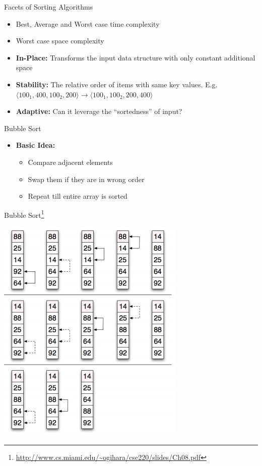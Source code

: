 \documentclass{beamer}
\begin{document}
\begin{frame}{Facets of Sorting Algorithms}
\begin{itemize}
\item Best, Average and Worst case time complexity 
\item Worst case space complexity
\item {\bf In-Place:} Transforms the input data structure with only constant additional space
\item {\bf Stability:} The relative order of items with same key values. 
E.g. $\langle 100_1, 400, 100_2, 200\rangle \rightarrow \langle 100_1, 100_2, 200, 400 \rangle$
\item {\bf Adaptive:} Can it leverage the ``sortedness'' of input?
\end{itemize}
\end{frame}



\begin{frame}{Bubble Sort}
\begin{itemize}
\item {\bf Basic Idea:}
\begin{itemize}
    \item Compare adjacent elements
    \item Swap them if they are in wrong order
    \item Repeat till entire array is sorted
\end{itemize}
\end{itemize}
\end{frame}


\begin{frame}{Bubble Sort\footnote{\url{http://www.cs.miami.edu/~ogihara/csc220/slides/Ch08.pdf}}}
\begin{center}
    \includegraphics[scale=0.5]{bubbleSort.png}
\end{center}
\end{frame}
\end{document}
